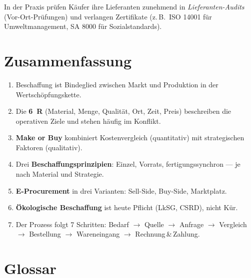\documentclass[11pt, a4paper]{article}
\begin{document}
In der Praxis prüfen Käufer ihre Lieferanten zunehmend in \emph{Lieferanten-Audits}
(Vor-Ort-Prüfungen) und verlangen Zertifikate (z.\,B.\ ISO 14001 für Umweltmanagement,
SA 8000 für Sozialstandards).

\section{Zusammenfassung}

\begin{enumerate}
  \item Beschaffung ist Bindeglied zwischen Markt und Produktion in der Wertschöpfungskette.
  \item Die \textbf{6~R} (Material, Menge, Qualität, Ort, Zeit, Preis) beschreiben die operativen Ziele und stehen häufig im Konflikt.
  \item \textbf{Make or Buy} kombiniert Kostenvergleich (quantitativ) mit strategischen Faktoren (qualitativ).
  \item Drei \textbf{Beschaffungsprinzipien}: Einzel, Vorrats, fertigungssynchron --- je nach Material und Strategie.
  \item \textbf{E-Procurement} in drei Varianten: Sell-Side, Buy-Side, Marktplatz.
  \item \textbf{Ökologische Beschaffung} ist heute Pflicht (LkSG, CSRD), nicht Kür.
  \item Der Prozess folgt 7 Schritten: Bedarf $\to$ Quelle $\to$ Anfrage $\to$ Vergleich $\to$ Bestellung $\to$ Wareneingang $\to$ Rechnung\,\&\,Zahlung.
\end{enumerate}

\newpage

\section*{Glossar}




\end{document}
